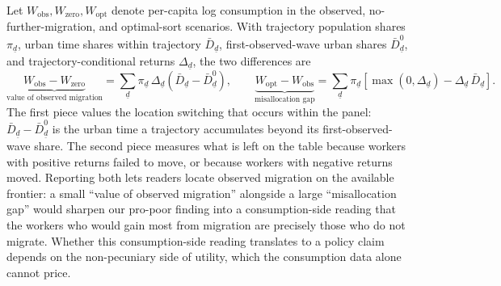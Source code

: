 Let $W_{\text{obs}}, W_{\text{zero}}, W_{\text{opt}}$ denote per-capita log consumption in the observed, no-further-migration, and optimal-sort scenarios.
With trajectory population shares $\pi_{\underline{d}}$, urban time shares within trajectory $\bar{D}_{\underline{d}}$, first-observed-wave urban shares $\bar{D}^0_{\underline{d}}$, and trajectory-conditional returns $\Delta_{\underline{d}}$, the two differences are
\begin{equation}\label{eq:misallocation-decomposition}
    \underbrace{W_{\text{obs}} - W_{\text{zero}}}_{\text{value of observed migration}} = \sum_{\underline{d}} \pi_{\underline{d}} \, \Delta_{\underline{d}} \left(\bar{D}_{\underline{d}} - \bar{D}^0_{\underline{d}}\right), \qquad
    \underbrace{W_{\text{opt}} - W_{\text{obs}}}_{\text{misallocation gap}} = \sum_{\underline{d}} \pi_{\underline{d}} \left[\max(0, \Delta_{\underline{d}}) - \Delta_{\underline{d}} \, \bar{D}_{\underline{d}}\right].
\end{equation}
The first piece values the location switching that occurs within the panel: $\bar{D}_{\underline{d}} - \bar{D}^0_{\underline{d}}$ is the urban time a trajectory accumulates beyond its first-observed-wave share.
The second piece measures what is left on the table because workers with positive returns failed to move, or because workers with negative returns moved.
Reporting both lets readers locate observed migration on the available frontier: a small ``value of observed migration'' alongside a large ``misallocation gap'' would sharpen our pro-poor finding into a consumption-side reading that the workers who would gain most from migration are precisely those who do not migrate.
Whether this consumption-side reading translates to a policy claim depends on the non-pecuniary side of utility, which the consumption data alone cannot price.

